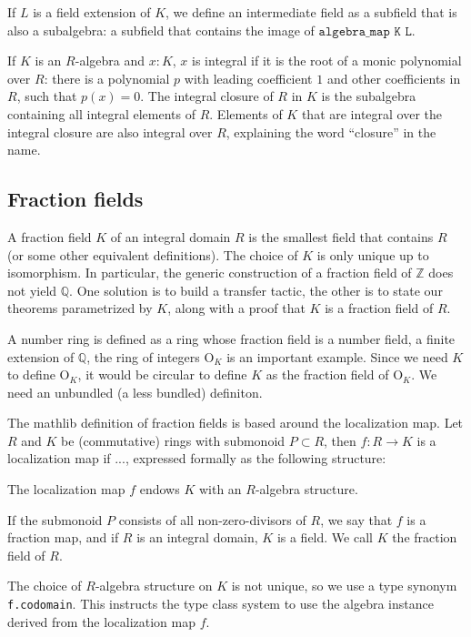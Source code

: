 \documentclass{lipics-v2021}
\newcommand{\lean}[1]{\texttt{#1}\xspace} %
\newcommand{\OK}{\mathrm{O}_K}
\newcommand{\Q}{\mathbb{Q}}
\newcommand{\Z}{\mathbb{Z}}
\begin{document}
If $L$ is a field extension of $K$, we define an intermediate field as a subfield that is also a subalgebra: a subfield that contains the image of $\lean{algebra\_map K L}$.

If $K$ is an $R$-algebra and $x : K$, $x$ is integral if it is the root of a monic polynomial over $R$: there is a polynomial $p$ with leading coefficient $1$ and other coefficients in $R$, such that $p(x) = 0$.
The integral closure of $R$ in $K$ is the subalgebra containing all integral elements of $R$.
Elements of $K$ that are integral over the integral closure are also integral over $R$, explaining the word ``closure'' in the name.

\subsection{Fraction fields}

A fraction field $K$ of an integral domain $R$ is the smallest field that contains $R$ (or some other equivalent definitions).
The choice of $K$ is only unique up to isomorphism.
In particular, the generic construction of a fraction field of $\Z$ does not yield $\Q$.
One solution is to build a transfer tactic, the other is to state our theorems parametrized by $K$, along with a proof that $K$ is a fraction field of $R$.

A number ring is defined as a ring whose fraction field is a number field, a finite extension of $\Q$, the ring of integers $\OK$ is an important example. Since we need $K$ to define $\OK$, it would be circular to define $K$ as the fraction field of $\OK$. We need an unbundled (a less bundled) definiton.

The mathlib definition of fraction fields is based around the localization map. Let $R$ and $K$ be (commutative) rings with submonoid $P \subset R$, then $f : R \to K$ is a localization map if ..., expressed formally as the following structure:

The localization map $f$ endows $K$ with an $R$-algebra structure.

If the submonoid $P$ consists of all non-zero-divisors of $R$, we say that $f$ is a fraction map, and if $R$ is an integral domain, $K$ is a field. We call $K$ the fraction field of $R$.

The choice of $R$-algebra structure on $K$ is not unique, so we use a type synonym \lean{f.codomain}. This instructs the type class system to use the algebra instance derived from the localization map $f$.
\end{document}
